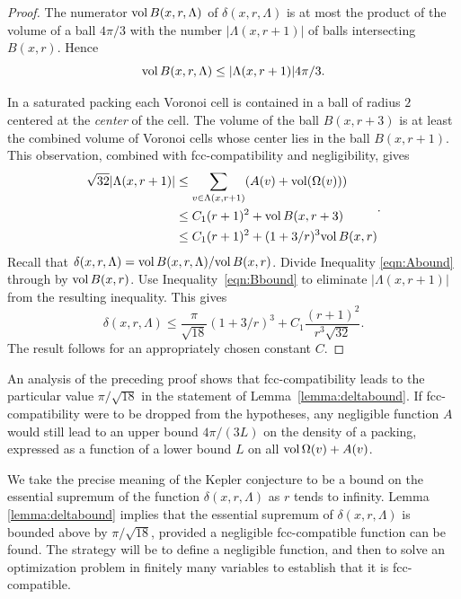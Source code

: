 \begin{proof}
The numerator ${\operatorname{vol}}\, B(x,r,\Lambda)$ of $\delta(x,r,\Lambda)$
is at most the product of the volume of a ball $4\pi/3$ with the
number $|\Lambda(x,r+1)|$ of balls intersecting $B(x,r)$.  Hence
    \begin{equation}
    {\operatorname{vol}}\, B(x,r,\Lambda) \le |\Lambda(x,r+1)| 4\pi/3.
    \label{eqn:Abound}
    \end{equation}

In a saturated packing each Voronoi cell is contained in a ball of
radius $2$ centered at the {\it center} of the cell.  The volume
of the ball $B(x,r+3)$ is at least the combined volume of Voronoi
cells whose center lies in the ball $B(x,r+1)$. This observation,
combined with fcc-compatibility and negligibility, gives
    \begin{equation}
    \begin{split}
    \sqrt{32}|\Lambda(x,r+1)|
    &\le \sum_{v\in\Lambda(x,r+1)} (A(v) +
    {\operatorname{vol}}(\Omega(v))) \\
    &\le C_1 (r+1)^2 + {\operatorname{vol}}\,B(x,r+3) \\
    &\le C_1 (r+1)^2 + (1+3/r)^3 {\operatorname{vol}}\,B(x,r)
    \label{eqn:Bbound}
    \end{split}.
    \end{equation}
Recall that $\delta(x,r,\Lambda)=
{\operatorname{vol}}\,B(x,r,\Lambda)/{\operatorname{vol}}\,B(x,r)$. Divide Inequality
\ref{eqn:Abound} through by ${\operatorname{vol}}\,B(x,r)$.  Use
Inequality~\ref{eqn:Bbound} to eliminate $|\Lambda(x,r+1)|$ from the
resulting inequality.  This gives
    $$\delta(x,r,\Lambda)
        \le \frac{\pi}{\sqrt{18}} (1+3/r)^3 + C_1 \frac{(r+1)^2}{r^3\sqrt{32}}.
    $$
The result follows for an appropriately chosen constant $C$.
\end{proof}

An analysis of the preceding proof shows that fcc-compatibility
leads to the particular value $\pi/\sqrt{18}$ in the statement of
Lemma~\ref{lemma:deltabound}.  If fcc-compatibility were to be
dropped from the hypotheses, any negligible function $A$ would
still lead to an upper bound $4\pi/(3L)$ on the density of a
packing, expressed as a function of a lower bound $L$ on all
${\operatorname{vol}}\,\Omega(v)+A(v)$.


\begin{remark} \label{remark:precise}
We take the precise meaning of the Kepler conjecture to be a bound
on the essential supremum of the function $\delta(x,r,\Lambda)$ as
$r$ tends to infinity. Lemma \ref{lemma:deltabound} implies that the
essential supremum of $\delta(x,r,\Lambda)$ is bounded above by
$\pi/\sqrt{18}$, provided a negligible fcc-compatible function can
be found.  The strategy will be to define a negligible function, and
then to solve an optimization problem in finitely many variables to
establish that it is fcc-compatible.
\end{remark}

